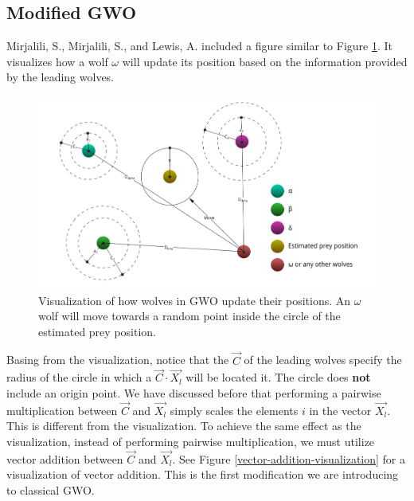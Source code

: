 \subsection{Modified GWO}
\label{methods-section-modified-gwo}

Mirjalili, S., Mirjalili, S., and Lewis, A. \cite{Mirjalili2014} included a figure similar to Figure \ref{gwo-positioning-update}. It visualizes how a wolf $\omega$ will update its position based on the information provided by the leading wolves.

\begin{figure}[h!]
	\centering
	\includegraphics[scale=0.3]{./images/chap05-methodology/gwo-position-updating.png}
	\caption{Visualization of how wolves in GWO update their positions. An $\omega$ wolf will move towards a random point inside the circle of the estimated prey position.}
	\label{gwo-positioning-update}
\end{figure}

Basing from the visualization, notice that the $\vec{C}$ of the leading wolves specify the radius of the circle in which a $\vec{C} \cdot \vec{X_{l}}$ will be located it. The circle does \textbf{not} include an origin point. We have discussed before that performing a pairwise multiplication between $\vec{C}$ and $\vec{X_{l}}$ simply scales the elements $i$ in the vector $\vec{X_{l}}$. This is different from the visualization. To achieve the same effect as the visualization, instead of performing pairwise multiplication, we must utilize vector addition between $\vec{C}$ and $\vec{X_{l}}$. See Figure \ref{vector-addition-visualization} for a visualization of vector addition. This is the first modification we are introducing to classical GWO.

